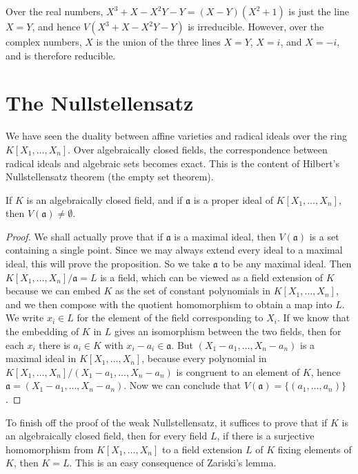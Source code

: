 \begin{example}
    Over the real numbers, $X^3 + X - X^2Y - Y = (X-Y)(X^2 + 1)$ is just the line $X = Y$, and hence $V(X^3 + X - X^2Y - Y)$ is irreducible. However, over the complex numbers, $X$ is the union of the three lines $X = Y$, $X = i$, and $X = -i$, and is therefore reducible.
\end{example}

\section{The Nullstellensatz}

We have seen the duality between affine varieties and radical ideals over the ring $K[X_1, \dots, X_n]$. Over algebraically closed fields, the correspondence between radical ideals and algebraic sets becomes exact. This is the content of Hilbert's Nullstellensatz theorem (the empty set theorem).

\begin{lemma}
    If $K$ is an algebraically closed field, and if $\mathfrak{a}$ is a proper ideal of $K[X_1, \dots, X_n]$, then $V(\mathfrak{a}) \neq \emptyset$.
\end{lemma}
\begin{proof}
    We shall actually prove that if $\mathfrak{a}$ is a maximal ideal, then $V(\mathfrak{a})$ is a set containing a single point. Since we may always extend every ideal to a maximal ideal, this will prove the proposition. So we take $\mathfrak{a}$ to be any maximal ideal. Then $K[X_1, \dots, X_n]/\mathfrak{a} = L$ is a field, which can be viewed as a field extension of $K$ because we can embed $K$ as the set of constant polynomials in $K[X_1, \dots, X_n]$, and we then compose with the quotient homomorphism to obtain a map into $L$. We write $x_i \in L$ for the element of the field corresponding to $X_i$. If we know that the embedding of $K$ in $L$ gives an isomorphism between the two fields, then for each $x_i$ there is $a_i \in K$ with $x_i - a_i \in \mathfrak{a}$. But $(X_1 - a_1, \dots, X_n - a_n)$ is a maximal ideal in $K[X_1, \dots, X_n]$, because every polynomial in $K[X_1, \dots, X_n]/(X_1 - a_1, \dots, X_n - a_n)$ is congruent to an element of $K$, hence $\mathfrak{a} = (X_1 - a_1, \dots, X_n - a_n)$. Now we can conclude that $V(\mathfrak{a}) = \{ (a_1, \dots, a_n) \}$.
\end{proof}

To finish off the proof of the weak Nullstellensatz, it suffices to prove that if $K$ is an algebraically closed field, then for every field $L$, if there is a surjective homomorphism from $K[X_1, \dots, X_n]$ to a field extension $L$ of $K$ fixing elements of $K$, then $K = L$. This is an easy consequence of Zariski's lemma.

